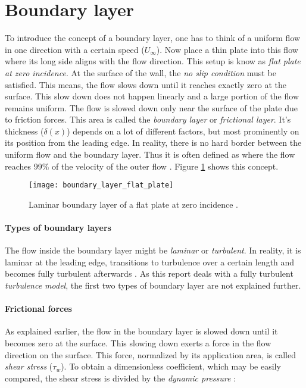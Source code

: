 \section{Boundary layer}
To introduce the concept of a boundary layer, one has to think of a uniform flow
in one direction with a certain speed ($U_{\infty}$). Now place a thin plate
into this flow where its long side aligns with the flow direction. This setup is
know as \textit{flat plate at zero incidence}. At the surface of the wall, the
\textit{no slip condition} must be satisfied. This means, the flow slows down
until it reaches exactly zero at the surface. This slow down does not happen
linearly and a large portion of the flow remains uniform. The flow is slowed
down only near the surface of the plate due to friction forces. This area is
called the \textit{boundary layer} or \textit{frictional layer}. It's thickness
($\delta(x)$) depends on a lot of different factors, but most prominently on its
position from the leading edge. In reality, there is no hard border between the
uniform flow and the boundary layer. Thus it is often defined as where the flow
reaches 99\% of the velocity of the outer flow \cite{Schlichting2018}. Figure
\ref{fig:boundary_layer_flat_plate} shows this concept.

\begin{figure}[H] \centering
\texttt{[image: boundary\_layer\_flat\_plate]}
    \caption{Laminar boundary layer of a flat plate at zero incidence \cite{Schlichting2018}.}
    \label{fig:boundary_layer_flat_plate}
\end{figure}

\paragraph{Types of boundary layers}
The flow inside the boundary layer might be \textit{laminar} or
\textit{turbulent}. In reality, it is laminar at the leading edge, transitions
to turbulence over a certain length and becomes fully turbulent afterwards
\cite{Schlichting2018}. As this report deals with a fully turbulent
\textit{turbulence model}, the first two types of boundary layer are not
explained further.

\paragraph{Frictional forces}
As explained earlier, the flow in the boundary layer is slowed down until it
becomes zero at the surface. This slowing down exerts a force in the flow
direction on the surface. This force, normalized by its application area, is
called \textit{shear stress} ($\tau_{w}$). To obtain a dimensionless
coefficient, which may be easily compared, the shear stress is divided by the
\textit{dynamic pressure} \cite{Schlichting2018}:

